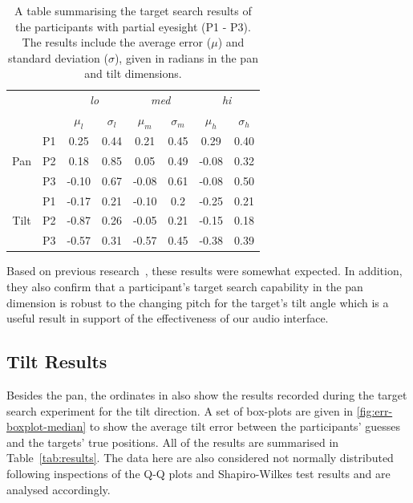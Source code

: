 \documentclass[sigconf, review=true, screen=true, anonymous=true]{acmart}
\begin{document}
\begin{table}
  \centering
  \caption{A table summarising the target search results of the participants with partial eyesight (P1 - P3). The results include the average error ($\mu$) and standard deviation ($\sigma$), given in radians in the pan and tilt dimensions.}
  \label{tab:vi-results}
  \begin{tabular}{|c|c|cc|cc|cc|}
    \hline
    \multicolumn{2}{|c|}{} & \multicolumn{2}{c|}{\emph{lo}} & \multicolumn{2}{c|}{\emph{med}} & \multicolumn{2}{c|}{\emph{hi}} \\
    \multicolumn{2}{|c|}{} & $\mu_l$ & $\sigma_l$ & $\mu_m$ & $\sigma_m$ & $\mu_h$ & $\sigma_h$ \\\hline\hline
    & P1 & 0.25 & 0.44 & 0.21 & 0.45 & 0.29 & 0.40 \\ \cline{2-8}
    Pan & P2 & 0.18 & 0.85 & 0.05 & 0.49 & -0.08 & 0.32 \\ \cline{2-8}
    & P3 & -0.10 & 0.67 & -0.08 & 0.61 & -0.08 & 0.50 \\ \hline\hline
    & P1 & -0.17 & 0.21 & -0.10 & 0.2 & -0.25 & 0.21 \\ \cline{2-8}
    Tilt & P2 & -0.87 & 0.26 & -0.05 & 0.21 & -0.15 & 0.18 \\ \cline{2-8}
    & P3 & -0.57 & 0.31 & -0.57 & 0.45 & -0.38 & 0.39 \\ \hline
  \end{tabular}
\end{table}

Based on previous research~\cite{zwiers2001spatial}, these results were somewhat expected.
In addition, they also confirm that a participant's target search capability in the pan dimension is robust to the changing pitch for the target's tilt angle which is a useful result in support of the effectiveness of our audio interface.

\subsection{Tilt Results}\label{sec:tilt-results}

Besides the pan, the ordinates in  also show the results recorded during the target search experiment for the tilt direction.
A set of box-plots are given in \cref{fig:err-boxplot-median} to show the average tilt error between the participants' guesses and the targets' true positions.
All of the results are summarised in Table~\ref{tab:results}. 
The data here are also considered not normally distributed following inspections of the Q-Q plots and Shapiro-Wilkes test results and are analysed accordingly.
\end{document}
